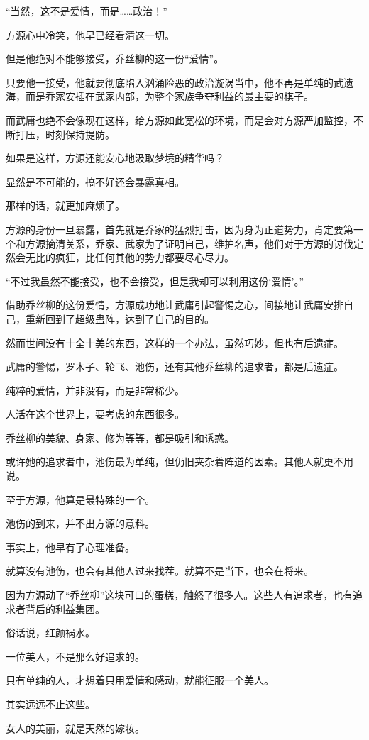 \begin{this_body}
“当然，这不是爱情，而是……政治！”

方源心中冷笑，他早已经看清这一切。

但是他绝对不能够接受，乔丝柳的这一份“爱情”。

只要他一接受，他就要彻底陷入汹涌险恶的政治漩涡当中，他不再是单纯的武遗海，而是乔家安插在武家内部，为整个家族争夺利益的最主要的棋子。

而武庸也绝不会像现在这样，给方源如此宽松的环境，而是会对方源严加监控，不断打压，时刻保持提防。

如果是这样，方源还能安心地汲取梦境的精华吗？

显然是不可能的，搞不好还会暴露真相。

那样的话，就更加麻烦了。

方源的身份一旦暴露，首先就是乔家的猛烈打击，因为身为正道势力，肯定要第一个和方源摘清关系，乔家、武家为了证明自己，维护名声，他们对于方源的讨伐定然会无比的疯狂，比任何其他的势力都要尽心尽力。

“不过我虽然不能接受，也不会接受，但是我却可以利用这份‘爱情’。”

借助乔丝柳的这份爱情，方源成功地让武庸引起警惕之心，间接地让武庸安排自己，重新回到了超级蛊阵，达到了自己的目的。

然而世间没有十全十美的东西，这样的一个办法，虽然巧妙，但也有后遗症。

武庸的警惕，罗木子、轮飞、池伤，还有其他乔丝柳的追求者，都是后遗症。

纯粹的爱情，并非没有，而是非常稀少。

人活在这个世界上，要考虑的东西很多。

乔丝柳的美貌、身家、修为等等，都是吸引和诱惑。

或许她的追求者中，池伤最为单纯，但仍旧夹杂着阵道的因素。其他人就更不用说。

至于方源，他算是最特殊的一个。

池伤的到来，并不出方源的意料。

事实上，他早有了心理准备。

就算没有池伤，也会有其他人过来找茬。就算不是当下，也会在将来。

因为方源动了“乔丝柳”这块可口的蛋糕，触怒了很多人。这些人有追求者，也有追求者背后的利益集团。

俗话说，红颜祸水。

一位美人，不是那么好追求的。

只有单纯的人，才想着只用爱情和感动，就能征服一个美人。

其实远远不止这些。

女人的美丽，就是天然的嫁妆。


\end{this_body}
